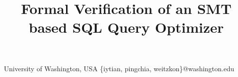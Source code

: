 \documentclass[11pt,nonatbib,preprint]{sigplanconf}
\begin{document}
\title{Formal Verification of an SMT based SQL Query Optimizer}

           {University of Washington, USA}
           {\{iytian, pingchia, weitzkon\}@washington.edu\vspace{-1em}}
\maketitle





% 
% 
% 
% 
% 
% 
% 
% 
% 
% 
% 

\printbibliography
\end{document}
